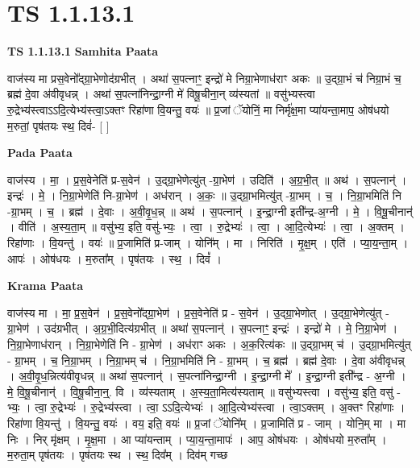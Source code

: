\documentclass[17pt]{extarticle}
\begin{document}
\section{ TS 1.1.13.1 }

\textbf{TS 1.1.13.1 } \newline
\textbf{Samhita Paata} \newline

वाज॑स्य मा प्रस॒वेनो᳚द्ग्रा॒भेणोद॑ग्रभीत् । अथा॑ स॒पत्नाꣳ॒॒ इन्द्रो॑ मे निग्रा॒भेणाध॑राꣳ अकः ॥ उ॒द्ग्रा॒भं च॑ निग्रा॒भं च॒ ब्रह्म॑ दे॒वा अ॑वीवृधन्न् । अथा॑ स॒पत्ना॑निन्द्रा॒ग्नी मे॑ विषू॒चीना॒न् व्य॑स्यतां ॥ वसु॑भ्यस्त्वा रु॒द्रेभ्य॑स्त्वाऽऽदि॒त्येभ्य॑स्त्वा॒ऽक्तꣳ रिहा॑णा वि॒यन्तु॒ वयः॑ ॥ प्र॒जां ॅयोनिं॒ मा निर्मृ॑क्ष॒मा प्या॑यन्ता॒माप॒ ओष॑धयो म॒रुतां॒ पृष॑तयः स्थ॒ दिवं॑- [ ] \newline

\textbf{Pada Paata} \newline

वाज॑स्य । मा॒ । प्र॒स॒वेनेति॑ प्र-स॒वेन॑ । उ॒द्ग्रा॒भेणेत्यु॑त् -ग्रा॒भेण॑ । उदिति॑ । अ॒ग्र॒भी॒त् ॥ अथ॑ । स॒पत्नान्॑ । इन्द्रः॑ । मे॒ । नि॒ग्रा॒भेणेति॑ नि-ग्रा॒भेण॑ । अध॑रान् । अ॒कः॒ ॥ उ॒द्ग्रा॒भमित्यु॑त् -ग्रा॒भम् । च॒ । नि॒ग्रा॒भमिति॑ नि -ग्रा॒भम् । च॒ । ब्रह्म॑ । दे॒वाः । अ॒वी॒वृ॒ध॒न्न् ॥ अथ॑ । स॒पत्नान्॑ । इ॒न्द्रा॒ग्नी इती᳚न्द्र-अ॒ग्नी । मे॒ । वि॒षू॒चीनान्॑ । वीति॑ । अ॒स्य॒ता॒म् ॥ वसु॑भ्य॒ इति॒ वसु॑-भ्यः॒ । त्वा॒ । रु॒द्रेभ्यः॑ । त्वा॒ । आ॒दि॒त्येभ्यः॑ । त्वा॒ । अ॒क्तम् । रिहा॑णाः । वि॒यन्तु॑ । वयः॑ ॥ प्र॒जामिति॑ प्र-जाम् । योनि᳚म् । मा । निरिति॑ । मृ॒क्ष॒म् । एति॑ । प्या॒य॒न्ता॒म् । आपः॑ । ओष॑धयः । म॒रुता᳚म् । पृष॑तयः । स्थ॒ । दिवं᳚ ।  \newline


\textbf{Krama Paata} \newline

वाज॑स्य मा । मा॒ प्र॒स॒वेन॑ । प्र॒स॒वेनो᳚द्ग्रा॒भेण॑ । प्र॒स॒वेनेति॑ प्र - स॒वेन॑ । उ॒द्ग्रा॒भेणोत् । उ॒द्ग्रा॒भेणेत्यु॑त् - ग्रा॒भेण॑ । उद॑ग्रभीत् । अ॒ग्र॒भी॒दित्य॑ग्रभीत् ॥ अथा॑ स॒पत्नान्॑ । स॒पत्नाꣳ॒॒ इन्द्रः॑ । इन्द्रो॑ मे । मे॒ नि॒ग्रा॒भेण॑ । नि॒ग्रा॒भेणाध॑रान् । नि॒ग्रा॒भेणेति॑ नि - ग्रा॒भेण॑ । अध॑राꣳ अकः । अ॒क॒रित्य॑कः ॥ उ॒द्ग्रा॒भम् च॑ । उ॒द्ग्रा॒भमित्यु॑त् - ग्रा॒भम् । च॒ नि॒ग्रा॒भम् । नि॒ग्रा॒भम् च॑ । नि॒ग्रा॒भमिति॑ नि - ग्रा॒भम् । च॒ ब्रह्म॑ । ब्रह्म॑ दे॒वाः । दे॒वा अ॑वीवृधन्न् । अ॒वी॒वृ॒ध॒न्नित्य॑वीवृधन्न् ॥ अथा॑ स॒पत्नान्॑ । स॒पत्ना॑निन्द्रा॒ग्नी । इ॒न्द्रा॒ग्नी मे᳚ । इ॒न्द्रा॒ग्नी इती᳚न्द्र - अ॒ग्नी । मे॒ वि॒षू॒चीनान्॑ । वि॒षू॒चीना॒न्॒. वि । व्य॑स्यताम् । अ॒स्य॒ता॒मित्य॑स्यताम् ॥ वसु॑भ्यस्त्वा । वसु॑भ्य॒ इति॒ वसु॑ - भ्यः॒ । त्वा॒ रु॒द्रेभ्यः॑ । रु॒द्रेभ्य॑स्त्वा । त्वा॒ ऽऽदि॒त्येभ्यः॑ । आ॒दि॒त्येभ्य॑स्त्वा । त्वा॒ऽक्तम् । अ॒क्तꣳ रिहा॑णाः । रिहा॑णा वि॒यन्तु॑ । वि॒यन्तु॒ वयः॑ । वय॒ इति॒ वयः॑ ॥ प्र॒जां ॅयोनि᳚म् । प्र॒जामिति॑ प्र - जाम् । योनि॒म् मा । मा निः । निर् मृ॑क्षम् । मृ॒क्ष॒मा । आ प्या॑यन्ताम् । प्या॒य॒न्ता॒मापः॑ । आप॒ ओष॑धयः । ओष॑धयो म॒रुता᳚म् । म॒रुता॒म् पृष॑तयः । पृष॑तयः स्थ । स्थ॒ दिव᳚म् । दिव॑म् गच्छ \newline
\end{document}
